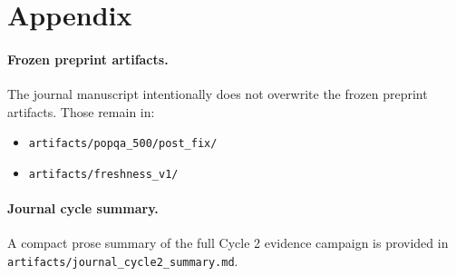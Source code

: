 \section{Appendix}

\paragraph{Frozen preprint artifacts.}
The journal manuscript intentionally does not overwrite the frozen preprint artifacts. Those remain in:
\begin{itemize}[leftmargin=1.5em]
\item \texttt{artifacts/popqa\_500/post\_fix/}
\item \texttt{artifacts/freshness\_v1/}
\end{itemize}

\paragraph{Journal cycle summary.}
A compact prose summary of the full Cycle 2 evidence campaign is provided in \texttt{artifacts/journal\_cycle2\_summary.md}.
